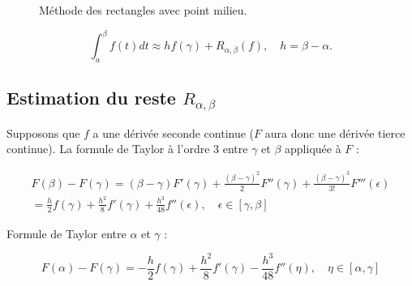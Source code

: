 \begin{figure}[H]
	\centering
	\caption{Méthode des rectangles avec point milieu.}
	\label{recM}
\end{figure}

\[
\displaystyle\int_a^\beta f(t) dt \approx h f(\gamma) + R_{\alpha, \beta}(f), \quad h = \beta - \alpha.
\]

\subsection{Estimation du reste \(R_{\alpha, \beta}\)}
Supposons que \(f\) a une dérivée seconde continue (\(F\) aura donc une dérivée tierce continue). La formule de Taylor à l'ordre 3 entre \(\gamma\) et \(\beta\) appliquée à \(F\) :

\begin{multline}\label{eqa2.5.1}
F(\beta) - F(\gamma) = (\beta - \gamma) F'(\gamma) + \frac{(\beta - \gamma)^2}{2} F''(\gamma) + \frac{(\beta - \gamma)^3}{3!} F'''(\epsilon)\\
= \frac{h}{2} f(\gamma) + \frac{h^2}{8} f'(\gamma) + \frac{h^3}{48} f''(\epsilon), \quad \epsilon \in [\gamma, \beta] 
\end{multline}

Formule de Taylor entre \(\alpha\) et \(\gamma\) :

\begin{equation}\label{eqa2.5.2}
F(\alpha) - F(\gamma) = -\frac{h}{2} f(\gamma) + \frac{h^2}{8} f'(\gamma) - \frac{h^3}{48} f''(\eta), \quad \eta \in [\alpha, \gamma] 
\end{equation}

